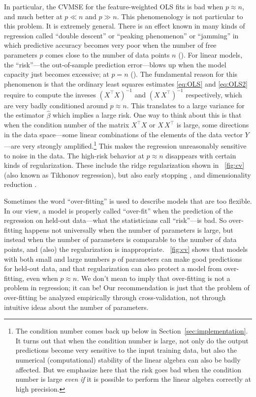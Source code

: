 \documentclass[12pt,letterpaper]{article}
\newcommand{\sectionname}{Section}
\begin{document}
In particular, the CVMSE for the feature-weighted OLS fits is bad when $p\approx n$, and much better at $p\ll n$ and $p \gg n$.
This phenomenology is not particular to this problem.
It is extremely general.
There is an effect known in many kinds of regression called ``double descent'' or ``peaking phenomenon'' or ``jamming'' in which predictive accuracy becomes very poor when the number of free parameters $p$ comes close to the number of data points $n$ (\citealt{jain198239, spigler2018jamming, geiger2019jamming}). For linear models, the ``risk''---the out-of-sample prediction error---blows up when the model capacity just becomes excessive; at $p=n$ (\citealt{hastie2019surprises}).
The fundamental reason for this phenomenon is that the ordinary least squares estimates \eqref{eq:OLS} and \eqref{eq:OLS2} require to compute the inveses $(X^\top X)^{-1}$ and $(X\,X^\top)^{-1}$ respectively, which are very badly conditioned around $p\approx n$.
This translates to a large variance for the estimator $\hat \beta$ which implies a large risk.
One way to think about this is that when the condition number of the matrix $X^\top X$ or $X\,X^\top$ is large, some directions in the data space---some linear combinations of the elements of the data vector $Y$---are very strongly amplified.\footnote{The condition number comes back up below in \sectionname~\ref{sec:implementation}. It turns out that when the condition number is large, not only do the output predictions become very sensitive to the input training data, but also the numerical (computational) stability of the linear algebra can also be badly affected. But we emphasize here that the risk goes bad when the condition number is large \emph{even if} it is possible to perform the linear algebra correctly at high precision.}
This makes the regression unreasonably sensitive to noise in the data.
The high-risk behavior at $p\approx n$ disappears with certain kinds of regularization.
These include the ridge regularization shown in \figurename~\ref{fig:cv} (also known as Tikhonov regression), but also early stopping \citep{hastie2019surprises}, and dimensionality reduction \citep{huang2020dimensionality}.

Sometimes the word ``over-fitting'' is used to describe models that are too flexible.
In our view, a model is properly called ``over-fit'' when the prediction of the regression on held-out data---what the statisticians call ``risk''---is bad.
So over-fitting happens not universally when the number of parameters is large, but instead when the number of parameters is comparable to the number of data points, and (also) the regularization is inappropriate.
\figurename~\ref{fig:cv} shows that models with both small and large numbers $p$ of parameters can make good predictions for held-out data, and that regularization can also protect a model from over-fitting, even when $p\approx n$.
We don't mean to imply that over-fitting is not a problem in regression; it can be!
Our recommendation is just that the problem of over-fitting be analyzed empirically through cross-validation, not through intuitive ideas about the number of parameters.
\end{document}
